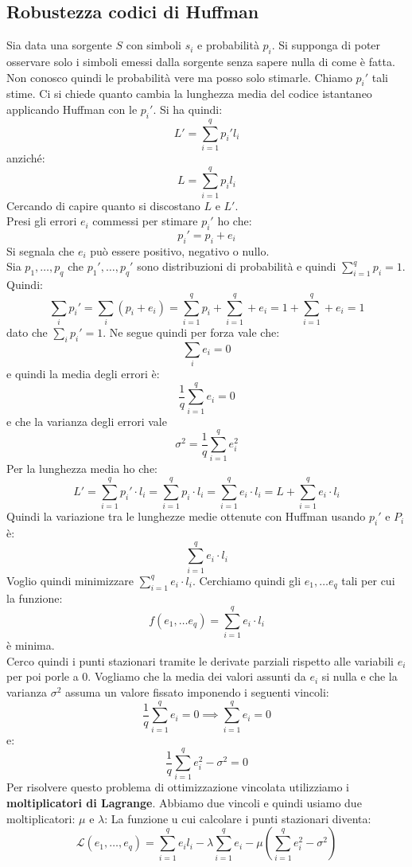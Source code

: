 \documentclass[a4paper,12pt, oneside]{book}
\begin{document}
\subsection{Robustezza codici di Huffman}
Sia data una sorgente $S$ con simboli $s_i$ e probabilità $p_i$. Si supponga di
poter osservare solo i simboli emessi dalla sorgente senza sapere nulla di come
è fatta. Non conosco quindi le probabilità vere ma posso solo stimarle. Chiamo
$p_i'$ tali stime. Ci si chiede quanto cambia la lunghezza media del codice
istantaneo applicando Huffman con le $p_i'$. Si ha quindi:
\[L'=\sum_{i=1}^q p_i'l_i\]
anziché:
\[L=\sum_{i=1}^q p_il_i\]
Cercando di capire quanto si discostano $L$ e $L'$.\\
Presi gli errori $e_i$ commessi per stimare $p_i'$ ho che:
\[p_i'=p_i+e_i\]
Si segnala che $e_i$ può essere positivo, negativo o nullo.\\
Sia $p_1,\ldots, p_q$ che $p_1',\ldots, p_q'$ sono distribuzioni di probabilità
e quindi $\sum_{i=1}^q p_i=1$.\\
Quindi:
\[\sum_ip_i'=\sum_i (p_i+e_i)=\sum_{i=1}^q p_i+\sum_{i=1}^q +e_i=1+\sum_{i=1}^q
  +e_i=1\] 
dato che $\sum_ip_i'=1$. Ne segue quindi per forza vale che:
\[\sum_i e_i=0\]
e quindi la media degli errori è:
\[\frac{1}{q}\sum_{i=1}^q e_i=0\]
e che la varianza degli errori vale
\[\sigma^2=\frac{1}{q}\sum_{i=1}^q e_i^2\]
Per la lunghezza media ho che:
\[L'=\sum_{i=1}^q p_i'\cdot l_i=\sum_{i=1}^q p_i\cdot l_i=\sum_{i=1}^q e_i\cdot
  l_i=L+\sum_{i=1}^q e_i\cdot l_i\]
Quindi la variazione tra le lunghezze medie ottenute con Huffman usando $p_i'$ e
$P_i$ è:
\[\sum_{i=1}^q e_i\cdot l_i\]
Voglio quindi minimizzare $\sum_{i=1}^q e_i\cdot l_i$. Cerchiamo quindi gli
$e_1,\ldots e_q$ tali per cui la funzione:
\[f(e_1,\ldots e_q)=\sum_{i=1}^q e_i\cdot l_i\]
è minima.\\
Cerco quindi i punti stazionari tramite le derivate parziali rispetto alle
variabili $e_i$ per poi porle a 0. Vogliamo che la media dei valori assunti da
$e_i$ si nulla e che la varianza $\sigma^2$ assuma un valore fissato imponendo i
seguenti vincoli:
\[\frac{1}{q}\sum_{i=1}^q e_i=0\implies \sum_{i=1}^q e_i=0\]
e:
\[\frac{1}{q}\sum_{i=1}^q e_i^2-\sigma^2 =0\]
Per risolvere questo problema di ottimizzazione vincolata utilizziamo i
\textbf{moltiplicatori di Lagrange}. Abbiamo due vincoli e quindi usiamo due
moltiplicatori: $\mu$ e $\lambda$:
La funzione u cui calcolare i punti stazionari diventa:
\[\mathcal{L}(e_1,\ldots,e_q)=\sum_{i=1}^qe_il_i-\lambda\sum_{i=1}^q
  e_i-\mu\left(\sum_{i=1}^q e_i^2-\sigma^2\right)\] 
\end{document}
